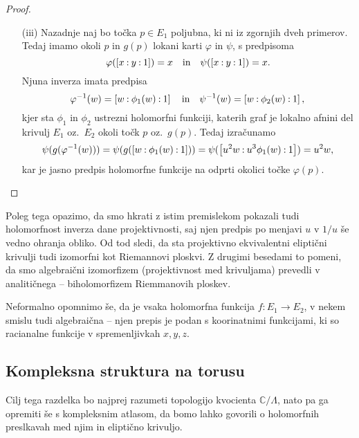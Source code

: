 \documentclass[mat1]{fmfdelo}
\numberwithin{equation}{section}
\newcommand{\C}{\mathbb C}
\newcommand{\inv}{^{-1}}
\newcommand{\pcoor}[1]{%
\begingroup\lccode`~=`: \lowercase{\endgroup
\edef~}{\mathbin{\mathchar\the\mathcode`:}\nobreak}%
\left[%
\begingroup
\mathcode`:=\string"8000
#1%
\endgroup
\right]%
}
\newcommand{\oz}{oz.\ }
\theoremstyle{definition}
\begin{document}
\begin{proof}
\begin{enumerate}
        \item[(iii)] Nazadnje naj bo točka $p \in E_1$ poljubna, ki ni iz zgornjih dveh primerov. Tedaj imamo okoli $p$ in $g(p)$ lokani karti $\varphi$ in $\psi$, s predpisoma
        \[
            \varphi(\pcoor{x : y : 1}) = x \quad \text{in} \quad
            \psi(\pcoor{x : y : 1}) = x. 
        \]   
        Njuna inverza imata predpisa
        \[
            \varphi\inv(w) = \pcoor{w : \phi_1(w) : 1} \quad \text{in} \quad
            \psi\inv(w) = \pcoor{w : \phi_2(w) : 1},
        \]
        kjer sta $\phi_1$ in $\phi_2$ ustrezni holomorfni funkciji, katerih graf je lokalno afnini del krivulj $E_1$ \oz $E_2$ okoli točk $p$ \oz $g(p)$. Tedaj izračunamo
        \[
            \psi(g(\varphi\inv(w))) =
            \psi(g(\pcoor{w : \phi_1(w) : 1})) =
            \psi(\pcoor{u^2 w : u^3 \phi_1(w) : 1}) = 
            u^2 w,
        \]
        kar je jasno predpis holomorfne funkcije na odprti okolici točke $\varphi(p)$. 
    \end{enumerate}
\end{proof}

Poleg tega opazimo, da smo hkrati z istim premislekom pokazali tudi holomorfnost inverza dane projektivnosti, saj njen predpis po menjavi $u$ v $1/u$ še vedno ohranja obliko. Od tod sledi, da sta projektivno ekvivalentni eliptični krivulji tudi izomorfni kot Riemannovi ploskvi. Z drugimi besedami to pomeni, da smo algebraični izomorfizem (projektivnost med krivuljama) prevedli v analitičnega -- biholomorfizem Riemmanovih ploskev.

Neformalno opomnimo še, da je vsaka holomorfna funkcija $f: E_1 \to E_2$, v nekem smislu tudi algebraična -- njen prepis je podan s koorinatnimi funkcijami, ki so racianalne funkcije v spremenljivkah $x,y,z$.  

\newpage

\subsection{Kompleksna struktura na torusu}
Cilj tega razdelka bo najprej razumeti topologijo kvocienta $\C/\Lambda$, nato pa ga opremiti še s kompleksnim atlasom, da bomo lahko govorili o holomorfnih preslkavah med njim in eliptično krivuljo. 
\end{document}

